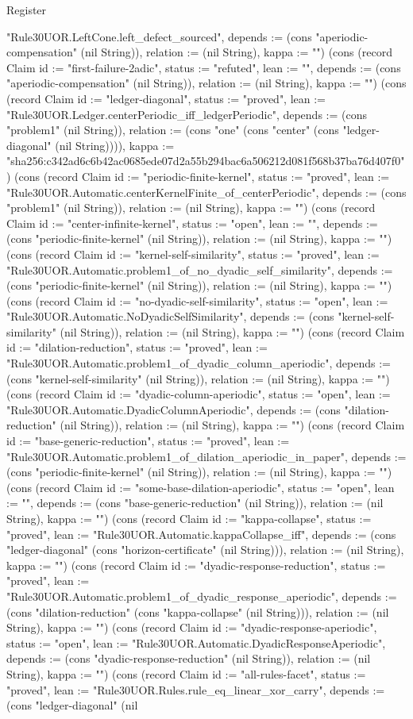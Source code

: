 \begin{lexlean}{Register}
\begin{semanticmodule}
{"Rule30UOR.LeftCone.left_defect_sourced", depends := (cons "aperiodic-compensation" (nil String)), relation := (nil String), kappa := ""}) (cons (record Claim {id := "first-failure-2adic", status := "refuted", lean := "", depends := (cons "aperiodic-compensation" (nil String)), relation := (nil String), kappa := ""}) (cons (record Claim {id := "ledger-diagonal", status := "proved", lean := "Rule30UOR.Ledger.centerPeriodic_iff_ledgerPeriodic", depends := (cons "problem1" (nil String)), relation := (cons "one" (cons "center" (cons "ledger-diagonal" (nil String)))), kappa := "sha256:c342ad6c6b42ac0685ede07d2a55b294bac6a506212d081f568b37ba76d407f0"}) (cons (record Claim {id := "periodic-finite-kernel", status := "proved", lean := "Rule30UOR.Automatic.centerKernelFinite_of_centerPeriodic", depends := (cons "problem1" (nil String)), relation := (nil String), kappa := ""}) (cons (record Claim {id := "center-infinite-kernel", status := "open", lean := "", depends := (cons "periodic-finite-kernel" (nil String)), relation := (nil String), kappa := ""}) (cons (record Claim {id := "kernel-self-similarity", status := "proved", lean := "Rule30UOR.Automatic.problem1_of_no_dyadic_self_similarity", depends := (cons "periodic-finite-kernel" (nil String)), relation := (nil String), kappa := ""}) (cons (record Claim {id := "no-dyadic-self-similarity", status := "open", lean := "Rule30UOR.Automatic.NoDyadicSelfSimilarity", depends := (cons "kernel-self-similarity" (nil String)), relation := (nil String), kappa := ""}) (cons (record Claim {id := "dilation-reduction", status := "proved", lean := "Rule30UOR.Automatic.problem1_of_dyadic_column_aperiodic", depends := (cons "kernel-self-similarity" (nil String)), relation := (nil String), kappa := ""}) (cons (record Claim {id := "dyadic-column-aperiodic", status := "open", lean := "Rule30UOR.Automatic.DyadicColumnAperiodic", depends := (cons "dilation-reduction" (nil String)), relation := (nil String), kappa := ""}) (cons (record Claim {id := "base-generic-reduction", status := "proved", lean := "Rule30UOR.Automatic.problem1_of_dilation_aperiodic_in_paper", depends := (cons "periodic-finite-kernel" (nil String)), relation := (nil String), kappa := ""}) (cons (record Claim {id := "some-base-dilation-aperiodic", status := "open", lean := "", depends := (cons "base-generic-reduction" (nil String)), relation := (nil String), kappa := ""}) (cons (record Claim {id := "kappa-collapse", status := "proved", lean := "Rule30UOR.Automatic.kappaCollapse_iff", depends := (cons "ledger-diagonal" (cons "horizon-certificate" (nil String))), relation := (nil String), kappa := ""}) (cons (record Claim {id := "dyadic-response-reduction", status := "proved", lean := "Rule30UOR.Automatic.problem1_of_dyadic_response_aperiodic", depends := (cons "dilation-reduction" (cons "kappa-collapse" (nil String))), relation := (nil String), kappa := ""}) (cons (record Claim {id := "dyadic-response-aperiodic", status := "open", lean := "Rule30UOR.Automatic.DyadicResponseAperiodic", depends := (cons "dyadic-response-reduction" (nil String)), relation := (nil String), kappa := ""}) (cons (record Claim {id := "all-rules-facet", status := "proved", lean := "Rule30UOR.Rules.rule_eq_linear_xor_carry", depends := (cons "ledger-diagonal" (nil }
\end{semanticmodule}
\end{lexlean}
